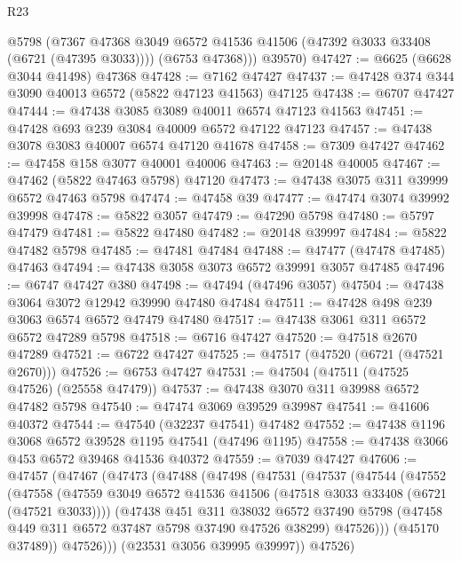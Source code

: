 \begin{lexlean}{R23}
\begin{coremodule}
          @5798
          (@7367 @47368 @3049 @6572 @41536 @41506 (@47392 @3033 @33408 (@6721 (@47395 @3033))))
          (@6753 @47368)))
      @39570)
@47427 := @6625 (@6628 @3044 @41498) @47368
@47428 := @7162 @47427
@47437 := @47428 @374 @344 @3090 @40013 @6572 (@5822 @47123 @41563) @47125
@47438 := @6707 @47427
@47444 := @47438 @3085 @3089 @40011 @6574 @47123 @41563
@47451 := @47428 @693 @239 @3084 @40009 @6572 @47122 @47123
@47457 := @47438 @3078 @3083 @40007 @6574 @47120 @41678
@47458 := @7309 @47427
@47462 := @47458 @158 @3077 @40001 @40006
@47463 := @20148 @40005
@47467 := @47462 (@5822 @47463 @5798) @47120
@47473 := @47438 @3075 @311 @39999 @6572 @47463 @5798
@47474 := @47458 @39
@47477 := @47474 @3074 @39992 @39998
@47478 := @5822 @3057
@47479 := @47290 @5798
@47480 := @5797 @47479
@47481 := @5822 @47480
@47482 := @20148 @39997
@47484 := @5822 @47482 @5798
@47485 := @47481 @47484
@47488 := @47477 (@47478 @47485) @47463
@47494 := @47438 @3058 @3073 @6572 @39991 @3057 @47485
@47496 := @6747 @47427 @380
@47498 := @47494 (@47496 @3057)
@47504 := @47438 @3064 @3072 @12942 @39990 @47480 @47484
@47511 := @47428 @498 @239 @3063 @6574 @6572 @47479 @47480
@47517 := @47438 @3061 @311 @6572 @6572 @47289 @5798
@47518 := @6716 @47427
@47520 := @47518 @2670 @47289
@47521 := @6722 @47427
@47525 := @47517 (@47520 (@6721 (@47521 @2670)))
@47526 := @6753 @47427
@47531 := @47504 (@47511 (@47525 @47526) (@25558 @47479))
@47537 := @47438 @3070 @311 @39988 @6572 @47482 @5798
@47540 := @47474 @3069 @39529 @39987
@47541 := @41606 @40372
@47544 := @47540 (@32237 @47541) @47482
@47552 := @47438 @1196 @3068 @6572 @39528 @1195 @47541 (@47496 @1195)
@47558 := @47438 @3066 @453 @6572 @39468 @41536 @40372
@47559 := @7039 @47427
@47606 := @47457
    (@47467
      (@47473
        (@47488
          (@47498
            (@47531
              (@47537
                (@47544
                  (@47552
                    (@47558
                      (@47559
                        @3049
                        @6572
                        @41536
                        @41506
                        (@47518 @3033 @33408 (@6721 (@47521 @3033))))
                      (@47438
                        @451
                        @311
                        @38032
                        @6572
                        @37490
                        @5798
                        (@47458 @449 @311 @6572 @37487 @5798 @37490 @47526 @38299)
                        @47526)))
                  (@45170 @37489))
                @47526)))
          (@23531 @3056 @39995 @39997))
        @47526)

\end{coremodule}
\end{lexlean}
